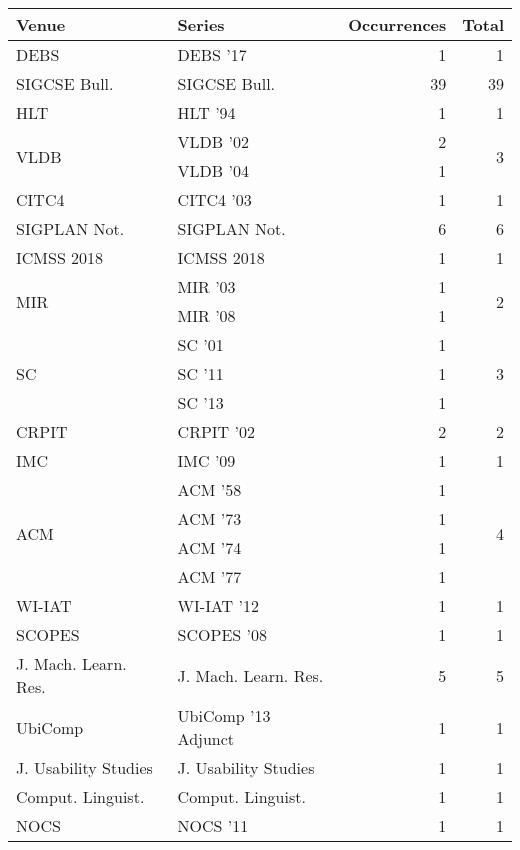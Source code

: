 \begin{table*}[t]
\begin{tabular}{llrr}
Venue & Series & Occurrences & Total\\\hline
\multirow{1}{*}{DEBS } & DEBS '17 & 1 & \multirow{1}{*}{1}\\
\multirow{1}{*}{SIGCSE Bull.} & SIGCSE Bull. & 39 & \multirow{1}{*}{39}\\
\multirow{1}{*}{HLT } & HLT '94 & 1 & \multirow{1}{*}{1}\\
\multirow{2}{*}{VLDB } & VLDB '02 & 2 & \multirow{2}{*}{3}\\
& VLDB '04 & 1 &\\
\multirow{1}{*}{CITC4 } & CITC4 '03 & 1 & \multirow{1}{*}{1}\\
\multirow{1}{*}{SIGPLAN Not.} & SIGPLAN Not. & 6 & \multirow{1}{*}{6}\\
\multirow{1}{*}{ICMSS 2018} & ICMSS 2018 & 1 & \multirow{1}{*}{1}\\
\multirow{2}{*}{MIR } & MIR '03 & 1 & \multirow{2}{*}{2}\\
& MIR '08 & 1 &\\
\multirow{3}{*}{SC } & SC '01 & 1 & \multirow{3}{*}{3}\\
& SC '11 & 1 &\\
& SC '13 & 1 &\\
\multirow{1}{*}{CRPIT } & CRPIT '02 & 2 & \multirow{1}{*}{2}\\
\multirow{1}{*}{IMC } & IMC '09 & 1 & \multirow{1}{*}{1}\\
\multirow{4}{*}{ACM } & ACM '58 & 1 & \multirow{4}{*}{4}\\
& ACM '73 & 1 &\\
& ACM '74 & 1 &\\
& ACM '77 & 1 &\\
\multirow{1}{*}{WI-IAT } & WI-IAT '12 & 1 & \multirow{1}{*}{1}\\
\multirow{1}{*}{SCOPES } & SCOPES '08 & 1 & \multirow{1}{*}{1}\\
\multirow{1}{*}{J. Mach. Learn. Res.} & J. Mach. Learn. Res. & 5 & \multirow{1}{*}{5}\\
\multirow{1}{*}{UbiComp } & UbiComp '13 Adjunct & 1 & \multirow{1}{*}{1}\\
\multirow{1}{*}{J. Usability Studies} & J. Usability Studies & 1 & \multirow{1}{*}{1}\\
\multirow{1}{*}{Comput. Linguist.} & Comput. Linguist. & 1 & \multirow{1}{*}{1}\\
\multirow{1}{*}{NOCS } & NOCS '11 & 1 & \multirow{1}{*}{1}\\

\end{tabular}
\end{table*}
